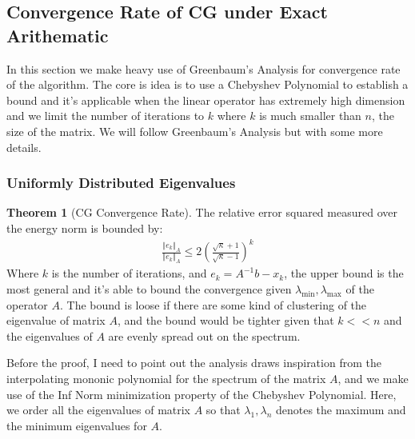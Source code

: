 \documentclass[]{article}
\theoremstyle{definition}
\newtheorem{theorem}{Theorem}            %
\begin{document}
    \subsection{Convergence Rate of CG under Exact Arithematic}
        In this section we make heavy use of Greenbaum's Analysis for convergence rate of the algorithm. The core is idea is to use a Chebyshev Polynomial to establish a bound and it's applicable when the linear operator has extremely high dimension and we limit the number of iterations to $k$ where $k$ is much smaller than $n$, the size of the matrix. We will follow Greenbaum's Analysis but with some more details. 
        \subsubsection{Uniformly Distributed Eigenvalues}
            \begin{theorem}[CG Convergence Rate]\label{theorem:CG_Convergence_Rate}
                The relative error squared measured over the energy norm is bounded by: 
                \begin{align}
                    \frac{\Vert e_k\Vert_A}{\Vert e_k\Vert_A}
                    \le 2 \left(
                            \frac{\sqrt{\kappa} + 1}{\sqrt{\kappa} - 1}
                    \right)^k
                \end{align}
                Where $k$ is the number of iterations, and $e_k = A^{-1}b - x_k$, the upper bound is the most general and it's able to bound the convergence given $\lambda_{\min}, \lambda_{\max}$ of the operator $A$. The bound is loose if there are some kind of clustering of the eigenvalue of matrix $A$, and the bound would be tighter given that $k<<n$ and the eigenvalues of $A$ are evenly spread out on the spectrum. 
            \end{theorem}
            Before the proof, I need to point out the analysis draws inspiration from the interpolating mononic polynomial for the spectrum of the matrix $A$, and we make use of the Inf Norm minimization property of the Chebyshev Polynomial. Here, we order all the eigenvalues of matrix $A$ so that $\lambda_1, \lambda_n$ denotes the maximum and the minimum eigenvalues for $A$. 
\end{document}
